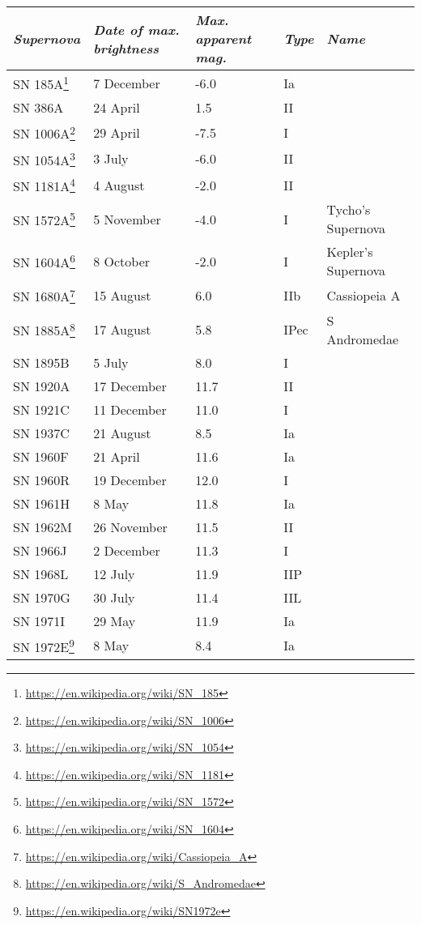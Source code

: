 \begin{longtabu} to \textwidth {l|l|l|l|X}\toprule
\emph{Supernova}            & \emph{Date of max. brightness} & \emph{Max. apparent mag.} & \emph{Type} & \emph{Name} \\\midrule
SN 185A\footnote{\url{https://en.wikipedia.org/wiki/SN_185}} & 7 December & -6.0 & Ia & \\\midrule
SN 386A & 24 April & 1.5 & II & \\\midrule
SN 1006A\footnote{\url{https://en.wikipedia.org/wiki/SN_1006}} & 29 April & -7.5 & I & \\\midrule
SN 1054A\footnote{\url{https://en.wikipedia.org/wiki/SN_1054}} & 3 July & -6.0 & II & \\\midrule
SN 1181A\footnote{\url{https://en.wikipedia.org/wiki/SN_1181}} & 4 August & -2.0 & II & \\\midrule
SN 1572A\footnote{\url{https://en.wikipedia.org/wiki/SN_1572}} & 5 November & -4.0 & I & Tycho's Supernova\\\midrule
SN 1604A\footnote{\url{https://en.wikipedia.org/wiki/SN_1604}} & 8 October & -2.0 & I & Kepler's Supernova\\\midrule
SN 1680A\footnote{\url{https://en.wikipedia.org/wiki/Cassiopeia_A}} & 15 August & 6.0 & IIb & Cassiopeia A\\\midrule
SN 1885A\footnote{\url{https://en.wikipedia.org/wiki/S_Andromedae}} & 17 August & 5.8 & IPec & S Andromedae\\\midrule
SN 1895B & 5 July & 8.0 & I & \\\midrule
SN 1920A & 17 December & 11.7 & II & \\\midrule
SN 1921C & 11 December & 11.0 & I & \\\midrule
SN 1937C & 21 August & 8.5 & Ia & \\\midrule
SN 1960F & 21 April & 11.6 & Ia & \\\midrule
SN 1960R & 19 December & 12.0 & I & \\\midrule
SN 1961H & 8 May & 11.8 & Ia & \\\midrule
SN 1962M & 26 November & 11.5 & II & \\\midrule
SN 1966J & 2 December & 11.3 & I & \\\midrule
SN 1968L & 12 July & 11.9 & IIP & \\\midrule
SN 1970G & 30 July & 11.4 & IIL & \\\midrule
SN 1971I & 29 May & 11.9 & Ia & \\\midrule
SN 1972E\footnote{\url{https://en.wikipedia.org/wiki/SN1972e}} & 8 May & 8.4 & Ia & \\\midrule

\end{longtabu}
